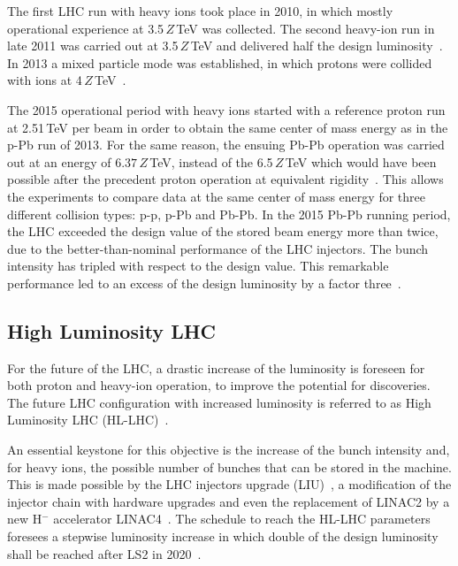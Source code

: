 The first LHC run with heavy ions took place in 2010, in which mostly operational experience at 3.5\,$Z\,$TeV was collected. The second heavy-ion run in late 2011 was carried out at 3.5\,$Z$\,TeV and delivered half the design luminosity~\cite{PbPbref01}. In 2013 a mixed particle mode was established, in which protons were collided with \lead ions at 4$\,Z\,$TeV~\cite{pPbref01}. 

The 2015 operational period with heavy ions started with a reference proton run at 2.51$\,$TeV per beam in order to obtain the same center of mass energy as in the p-Pb run of 2013. For the same reason, the ensuing Pb-Pb operation was carried out at an energy of $6.37\,Z\,$TeV, instead of the 6.5$\,Z\,$TeV which would have been possible after the precedent proton operation at equivalent rigidity~\cite{IPAC16:TUPMW027}. This allows the experiments to compare data at the same center of mass energy for three different collision types: p-p, p-Pb and Pb-Pb. In the 2015 Pb-Pb running period, the LHC exceeded the design value of the stored \lead beam energy more than twice, due to the better-than-nominal performance of the LHC injectors. The bunch intensity has tripled with respect to the design value. This remarkable performance led to an excess of the design luminosity by a factor three~\cite{IPAC16:TUPMW027}.


\subsection{High Luminosity LHC} \label{chap:introhl}



For the future of the LHC, a drastic increase of the luminosity is foreseen for both proton and heavy-ion operation, to improve the potential for discoveries. The future LHC configuration with increased luminosity is referred to as High Luminosity LHC (HL-LHC)~\cite{HLDR,hllhc:asdhep}.

An essential keystone for this objective is the increase of the bunch intensity and, for heavy ions, the possible number of bunches that can be stored in the machine. This is made possible by the LHC injectors upgrade (LIU)~\cite{IPAC11:WEPS017,IPAC2015:THPF093}, a modification of the injector chain with hardware upgrades and even the replacement of LINAC2 by a new H$^-$ accelerator LINAC4~\cite{IPAC2015:THPF093}. The schedule to reach the HL-LHC parameters foresees a stepwise luminosity increase in which double of the design luminosity shall be reached after LS2 in 2020~\cite{hllhc:asdhep}.




